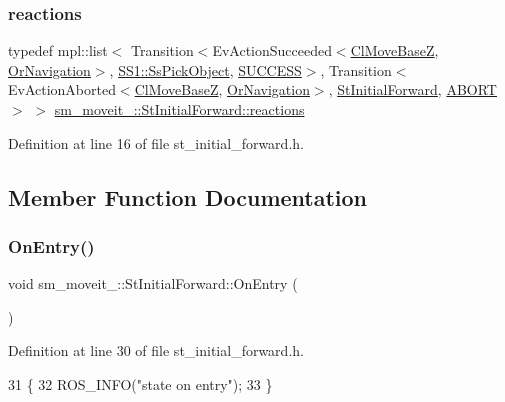 \subsubsection{\texorpdfstring{reactions}{reactions}}
{\footnotesize\ttfamily typedef mpl\+::list$<$ Transition$<$Ev\+Action\+Succeeded$<$\hyperlink{classcl__move__base__z_1_1ClMoveBaseZ}{Cl\+Move\+BaseZ}, \hyperlink{classsm__moveit__3_1_1OrNavigation}{Or\+Navigation}$>$, \hyperlink{structsm__moveit__3_1_1SS1_1_1SsPickObject}{S\+S1\+::\+Ss\+Pick\+Object}, \hyperlink{classSUCCESS}{S\+U\+C\+C\+E\+SS}$>$, Transition$<$Ev\+Action\+Aborted$<$\hyperlink{classcl__move__base__z_1_1ClMoveBaseZ}{Cl\+Move\+BaseZ}, \hyperlink{classsm__moveit__3_1_1OrNavigation}{Or\+Navigation}$>$, \hyperlink{structsm__moveit__3_1_1StInitialForward}{St\+Initial\+Forward}, \hyperlink{classABORT}{A\+B\+O\+RT}$>$ $>$ \hyperlink{structsm__moveit__3_1_1StInitialForward_afb6ed667a9bcc95023882f0e9c903d34}{sm\+\_\+moveit\+\_\+::\+St\+Initial\+Forward\+::reactions}}



Definition at line 16 of file st\+\_\+initial\+\_\+forward.\+h.



\subsection{Member Function Documentation}
\mbox{\label{structsm__moveit__3_1_1StInitialForward_a494ff696db5277bbf79467e4e03f9ccf}} 
\subsubsection{\texorpdfstring{On\+Entry()}{OnEntry()}}
{\footnotesize\ttfamily void sm\+\_\+moveit\+\_\+::\+St\+Initial\+Forward\+::\+On\+Entry (\begin{DoxyParamCaption}{ }\end{DoxyParamCaption})\hspace{0.3cm}{\ttfamily [inline]}}



Definition at line 30 of file st\+\_\+initial\+\_\+forward.\+h.


\begin{DoxyCode}
31     \{
32         ROS\_INFO(\textcolor{stringliteral}{"state on entry"});
33     \}
\end{DoxyCode}
\mbox{\label{structsm__moveit__3_1_1StInitialForward_af5c6190f58e14eb34d9abca713aad9eb}} 
